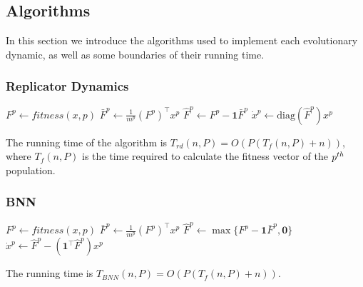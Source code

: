 
\subsection{Algorithms}
 In this section we introduce the algorithms used to implement each evolutionary dynamic, as well as some boundaries of their running time.

 
 
 
 

\subsubsection{Replicator Dynamics}



\begin{algorithm}[H]

 \BlankLine
 
  {
  $ F^p \leftarrow fitness(x, p)$\;
  $ \bar{F}^p \leftarrow \frac{1}{m^p} (F^p)^\top x^p$\;
  $ \hat{F}^p \leftarrow F^p - \boldsymbol{1} \bar{F}^p$\;
  $ \dot{x}^p \leftarrow \text{diag}(\hat{F}^p) x^p $\;
 }
\end{algorithm}
%
The running time of the algorithm is $T_{rd}(n, P) = O( P (  T_{f}(n,P) + n) ) $, where $T_{f}(n,P)$ is the time required to calculate the fitness vector of the $p^{th}$ population.







\subsubsection{BNN}

\begin{algorithm}[H]

 \BlankLine
 
  {
  $ F^p \leftarrow fitness(x, p)$\;
  $ \bar{F}^p \leftarrow \frac{1}{m^p} (F^p)^\top x^p$\;
  $ \hat{F}^p \leftarrow \max\{F^p - \boldsymbol{1} \bar{F}^p, \boldsymbol{0}\}$\;
  $ \dot{x}^p \leftarrow \hat{F}^p - (\boldsymbol{1}^\top \hat{F}^p) x^p $\;
 }
\end{algorithm}
%
The running time is $T_{BNN}(n,P) = O( P (  T_{f}(n,P) + n) ) $.








